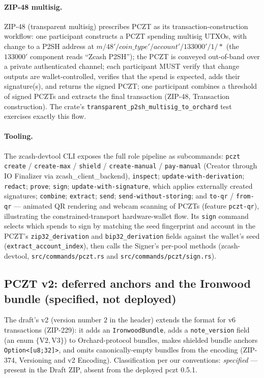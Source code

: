\documentclass[11pt,a4paper]{article}
\theoremstyle{definition}
\begin{document}
\paragraph{ZIP-48 multisig.} ZIP-48 (transparent multisig) prescribes
PCZT as its transaction-construction workflow: one participant constructs
a PCZT spending multisig UTXOs, with change to a P2SH address at
$m/48'/\mathit{coin\_type}'/\mathit{account}'/133000'/1/{*}$ (the
$133000'$ component reads ``Zcash P2SH''); the PCZT is conveyed
out-of-band over a private authenticated channel; each participant MUST
verify that change outputs are wallet-controlled, verifies that the spend
is expected, adds their signature(s), and returns the signed PCZT; one
participant combines a threshold of signed PCZTs and extracts the final
transaction (ZIP-48, Transaction construction). The crate's
\texttt{transparent\_p2sh\_multisig\_to\_orchard} test exercises exactly
this flow.

\paragraph{Tooling.} The \textsf{zcash-devtool} CLI exposes the full role
pipeline as subcommands: \texttt{pczt create} / \texttt{create-max} /
\texttt{shield} / \texttt{create-manual} / \texttt{pay-manual} (Creator
through IO Finalizer via \textsf{zcash\_client\_backend}),
\texttt{inspect}; \texttt{update-with-derivation}; \texttt{redact};
\texttt{prove}; \texttt{sign}; \texttt{update-with-signature}, which
applies externally created signatures; \texttt{combine};
\texttt{extract}; \texttt{send}; \texttt{send-without-storing}; and
\texttt{to-qr} / \texttt{from-qr} ---
animated QR rendering and webcam scanning of PCZTs (feature
\texttt{pczt-qr}), illustrating the constrained-transport hardware-wallet
flow. Its \texttt{sign} command selects which spends to sign by matching
the seed fingerprint and account in the PCZT's
\texttt{zip32\_derivation} and \texttt{bip32\_derivation} fields against
the wallet's seed
(\texttt{extract\_account\_index}), then calls the Signer's per-pool
methods (\textsf{zcash-devtool}, \texttt{src/commands/pczt.rs} and
\texttt{src/commands/pczt/sign.rs}).

\subsection{PCZT v2: deferred anchors and the Ironwood bundle
(specified, not deployed)}\label{sec:pczt-v2}

The draft's v2 (version number $2$ in the header) extends the format for
v6 transactions (ZIP-229): it adds an \texttt{IronwoodBundle}, adds a
\texttt{note\_version} field (an enum $\{\mathrm{V2}, \mathrm{V3}\}$) to
Orchard-protocol bundles, makes shielded bundle anchors
\texttt{Option<[u8;32]>}, and omits canonically-empty bundles from the
encoding (ZIP-374, Versioning and v2 Encoding). Classification per our
conventions: \emph{specified} --- present in the Draft ZIP, absent from
the deployed \textsf{pczt} 0.5.1.
\end{document}
